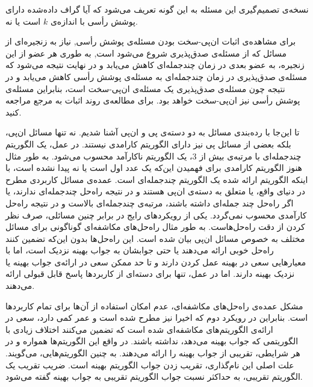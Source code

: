 نسخه‌ی تصمیم‌گیری این مسئله به این گونه تعریف می‌شود که آیا گراف داده‌شده دارای پوشش رأسی با اندازه‌ی $k$ است یا نه.



برای مشاهده‌ی اثبات ان‌پی-سخت بودن مسئله‌ی پوشش رأسی, نیاز به زنجیره‌ای از مسائل که از مسئله‌ی صدق‌پذیری شروع می‌شود است, به طوری هر عضو از این زنجیره، به عضو بعدی در زمان چندجمله‌ای کاهش می‌یابد و در نهایت نتیجه می‌شود که مسئله‌ی صدق‌پذیری در زمان چندجمله‌ای به مسئله‌ی پوشش رأسی کاهش می‌یابد و در نتیجه چون مسئله‌ی صدق‌پذیری یک مسئله‌ی ان‌پی-سخت است، بنابراین مسئله‌ی پوشش رأسی نیز ان‌پی-سخت خواهد بود. برای مطالعه‌ی روند اثبات به مرجع  مراجعه کنید. 



تا این‌جا با رده‌بندی مسائل به دو دسته‌ی پی و ان‌پی آشنا شدیم. نه تنها مسائل ان‌پی، بلکه بعضی از مسائل پی نیز دارای الگوریتم کارامدی نیستند. در عمل، یک الگوریتم چندجمله‌ای با مرتبه‌ی بیش از $3$، یک الگوریتم ناکارآمد محسوب می‌شود. به طور مثال هنوز‌ الگوریتم کارامدی برای فهمیدن این‌که یک عدد اول است یا نه پیدا نشده است، با اینکه الگوریتم ارائه شده یک الگوریتم چندجمله‌ای است. عمده‌ی مسائل کاربردی مطرح در دنیای واقع، یا متعلق به دسته‌ی ان‌پی هستند و در نتیجه راه‌حل چندجمله‌ای ندارند، یا اگر راه‌حل چند جمله‌ای داشته باشند، مرتبه‌ی چندجمله‌ای بالاست و در نتیجه راه‌حل کارآمدی محسوب نمی‌گردد. یکی از رویکردهای رایج در برابر چنین مسائلی، صرف نظر کردن از دقت راه‌حل‌هاست. به طور مثال راه‌حل‌های مکاشفه‌ای گوناگونی برای مسائل مختلف به خصوص مسائل ان‌پی بیان شده است. این راه‌حل‌ها بدون این‌که تضمین کنند راه‌حل خوبی ارائه می‌دهند یا حتی جوابشان به جواب بهینه نزدیک است، اما با معیار‌هایی سعی در بهینه عمل کردن دارند و تا حد ممکن سعی در ارائه‌ی جواب بهینه یا نزدیک بهینه دارند. اما در عمل، تنها برای دسته‌ای از کاربردها پاسخ قابل قبولی ارائه می‌دهند. 

مشکل عمده‌ی راه‌حل‌های مکاشفه‌ای، عدم امکان استفاده‌ از آن‌ها برای تمام کاربردها است. بنابراین در رویکرد دوم که اخیرا نیز مطرح شده است و عمر کمی دارد، سعی در ارائه‌ی الگوریتم‌های مکاشفه‌ای شده است که تضمین می‌کنند اختلاف زیادی با الگوریتمی که جواب بهینه می‌دهد، نداشته باشند. در واقع این الگوریتم‌ها همواره و در هر شرایطی، تقریبی از جواب بهینه را ارائه می‌دهند. به چنین الگوریتم‌هایی،  می‌گویند. علت اصلی این نام‌گذاری، تقریب زدن جواب الگوریتم بهینه است. ضریب تقریب یک الگوریتم تقریبی، به حداکثر نسبت جواب الگوریتم تقریبی به جواب بهینه گفته می‌شود.

